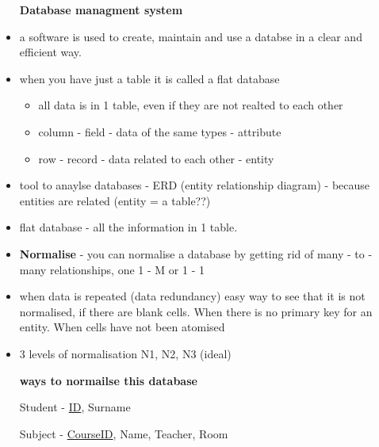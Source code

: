 \documentclass[12pt, a4, twoside]{article}
\begin{document}
\begin{center}
\begin{itemize}

    \textbf{Database managment system }
    \item a software is used to create, maintain and use a databse in a clear and efficient way. 
    \item when you have just a table it is called a flat database
    \begin{itemize}
      \item all data is in 1 table, even if they are not realted to each other 
      \item column - field - data of the same types - attribute 
      \item row - record - data related to each other - entity 
    \end{itemize}
    \item tool to anaylse databases - ERD (entity relationship diagram) - because entities are related (entity = a table??)
    \item flat database - all the information in 1 table. 
    \item \textbf{Normalise} - you can normalise a database by getting rid of many - to - many relationships, one 1 - M or 1 - 1 
    \item when data is repeated (data redundancy) easy way to see that it is not normalised, if there are blank cells. When there is no primary key for an entity. When cells have not been atomised
    \item 3 levels of normalisation N1, N2, N3 (ideal) 
    \begin{center}
      \textbf{ways to normailse this database}
      \begin{center}
      \end{center}
      Student - \underline{ID}, Surname

      Subject - \underline{CourseID}, Name, Teacher, Room


\end{center}
\end{itemize}
\end{center}
\end{document}
